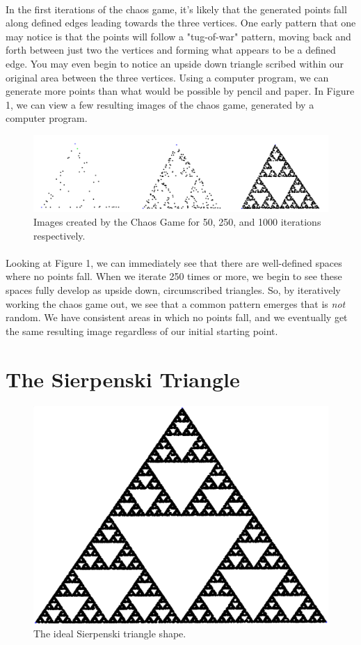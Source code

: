 \documentclass{article}
\begin{document}
\paragraph{}
In the first iterations of the chaos game, it's likely that the generated points fall along defined edges leading towards the three vertices. One early pattern that one may notice is that the points will follow a "tug-of-war" pattern, moving back and forth between just two the vertices and forming what appears to be a defined edge. You may even begin to notice an upside down triangle scribed within our original area between the three vertices. Using a computer program, we can generate more points than what would be possible by pencil and paper. In Figure 1, we can view a few resulting images of the chaos game, generated by a computer program.
\begin{figure}[H]
    \includegraphics[width=\linewidth, height=.2\textheight]{combined_image}
    \caption{Images created by the Chaos Game for 50, 250, and 1000 iterations respectively.}
\end{figure}
\paragraph{}
Looking at Figure 1, we can immediately see that there are well-defined spaces where no points fall. When we iterate 250 times or more, we begin to see these spaces fully develop as upside down, circumscribed triangles. So, by iteratively working the chaos game out, we see that a common pattern emerges that is \textit{not} random. We have consistent areas in which no points fall, and we eventually get the same resulting image regardless of our initial starting point.
\section*{The Sierpenski Triangle}
\begin{figure}[H]
    \centering
    \includegraphics[width=.5\linewidth, height=.25\textheight]{ideal}
    \caption{The ideal Sierpenski triangle shape.}
\end{figure}
\end{document}

